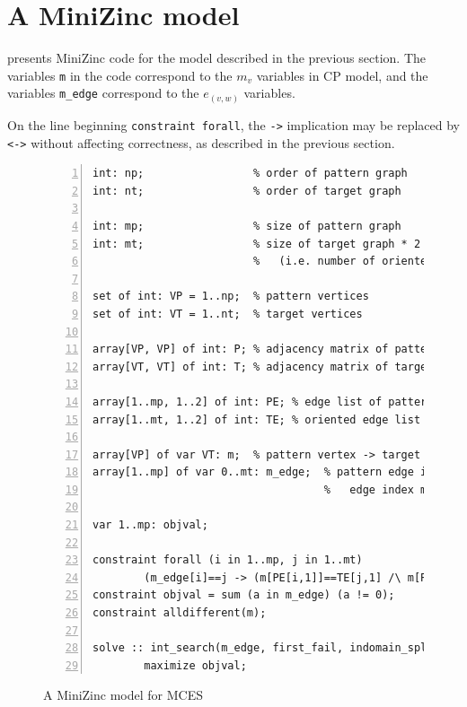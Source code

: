 %



\section{A MiniZinc model}\label{sec:minizinc-model}

 presents MiniZinc code for the model described in the
previous section.  The variables \texttt{m} in the code correspond to the
$m_v$ variables in CP model, and the variables \texttt{m\_edge} correspond
to the $e_{(v,w)}$ variables.

On the line beginning \texttt{constraint forall}, the \texttt{->} implication
may be replaced by \texttt{<->} without affecting correctness, as described
in the previous section.

\begin{figure}[htb]
\vspace{.8em}
\footnotesize
\centering
\begin{Verbatim}[numbers=left]
int: np;                 % order of pattern graph
int: nt;                 % order of target graph

int: mp;                 % size of pattern graph
int: mt;                 % size of target graph * 2
                         %   (i.e. number of oriented edges)

set of int: VP = 1..np;  % pattern vertices
set of int: VT = 1..nt;  % target vertices

array[VP, VP] of int: P; % adjacency matrix of pattern graph
array[VT, VT] of int: T; % adjacency matrix of target graph

array[1..mp, 1..2] of int: PE; % edge list of pattern graph
array[1..mt, 1..2] of int: TE; % oriented edge list of target graph

array[VP] of var VT: m;  % pattern vertex -> target vertex mappings
array[1..mp] of var 0..mt: m_edge;  % pattern edge index -> target
                                    %   edge index mappings. 0 means _|_

var 1..mp: objval;

constraint forall (i in 1..mp, j in 1..mt)
        (m_edge[i]==j -> (m[PE[i,1]]==TE[j,1] /\ m[PE[i,2]]==TE[j,2]));
constraint objval = sum (a in m_edge) (a != 0);
constraint alldifferent(m);

solve :: int_search(m_edge, first_fail, indomain_split, complete)
        maximize objval;
\end{Verbatim}
\caption{A MiniZinc model for MCES}\label{fig:model3}
\end{figure}

